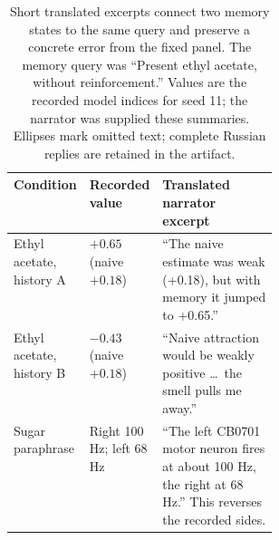 \begin{table}[t]
\caption{Short translated excerpts connect two memory states to the same query and preserve a concrete error from the fixed panel. The memory query was ``Present ethyl acetate, without reinforcement.'' Values are the recorded model indices for seed 11; the narrator was supplied these summaries. Ellipses mark omitted text; complete Russian replies are retained in the artifact.}
\label{tab:dialogue}
\small
\begin{tabularx}{\linewidth}{@{}p{0.18\linewidth}p{0.16\linewidth}X@{}}
\toprule
Condition & Recorded value & Translated narrator excerpt \\
\midrule
Ethyl acetate, history A & $+0.65$ (naive $+0.18$) & ``The naive estimate was weak (+0.18), but with memory it jumped to +0.65.'' \\
Ethyl acetate, history B & $-0.43$ (naive $+0.18$) & ``Naive attraction would be weakly positive \ldots\ the smell pulls me away.'' \\
Sugar paraphrase & Right 100 Hz; left 68 Hz & ``The left CB0701 motor neuron fires at about 100 Hz, the right at 68 Hz.'' This reverses the recorded sides. \\
\bottomrule
\end{tabularx}
\end{table}
